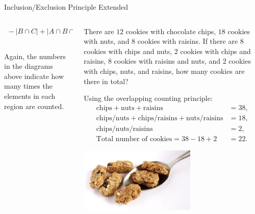 \documentclass[9pt,aspectratio=169]{beamer}
\begin{document}
\begin{frame}{Inclusion/Exclusion Principle Extended}
\begin{columns}[T]
\begin{column}{0.5\textwidth}
{\begin{columns}[totalwidth=1\textwidth]
\begin{column}{0.33\textwidth}
\begin{center}
\begin{multline*}
              {} - |B \cap C| + | A \cap B \cap C|
            \end{multline*} 
          \end{center}
        \end{column}
      \end{columns}
      }
      \vspace*{-0.5\baselineskip}
      Again, the numbers in the diagrams above indicate how many times the elements in each region are counted. 
    \end{column}
    \begin{column}{0.5\textwidth}
      \begin{problem}
        There are $12$ cookies with chocolate chips, $18$ cookies with nuts, and $8$ cookies with raisins.  If there are $8$ cookies with chips and nuts, $2$ cookies with chips and raisins, $8$ cookies with raisins and nuts, and $2$ cookies with chips, nuts, and raisins, how many cookies are there in total?
      \end{problem}
      Using the overlapping counting principle:
      \begin{align*}
        \text{chips} + \text{nuts} + \text{raisins} &= 38, \\
        \text{chips/nuts} + \text{chips/raisins} + \text{nuts/raisins} &= 18, \\
        \text{chips/nuts/raisins} &= 2, \\
        \text{Total number of cookies} = 38 - 18 + 2 &= 22.
      \end{align*}
      \begin{center}
        \vspace*{-\baselineskip}
        \includegraphics[width=0.6\textwidth]{08 - Inclusion Exclusion Principle/cookies.jpg}
      \end{center}
    \end{column}
  \end{columns}
\end{frame}
\end{document}
